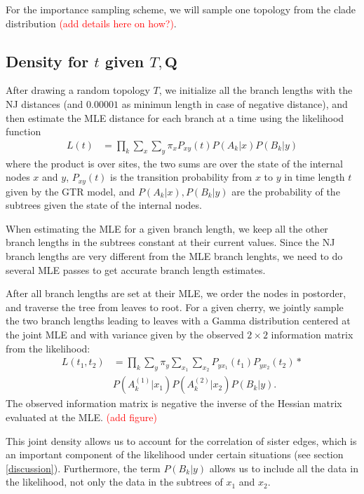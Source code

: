 \documentclass[conference]{IEEEtran}
\newcommand{\falta}[1]{\textcolor{red}{#1}}
\begin{document}
For the importance sampling scheme, we will sample one topology from
the clade distribution \falta{(add details here on how?)}.


\subsection*{Density for $t$ given $T,\mathbf{Q}$}
After drawing a random topology $T$, we initialize all the branch
lengths with the NJ distances (and $0.00001$ as minimun length in case
of negative distance), and then estimate the MLE distance for each
branch at a time using the likelihood function
\begin{align*}
L(t) &= \prod_k \sum_x \sum_y \pi_x P_{xy}(t)P(A_k|x)P(B_k|y)
\end{align*}
where the product is over sites, the two sums are over the state of the
internal nodes $x$ and $y$, $P_{xy}(t)$ is the transition probability
from $x$ to $y$ in time length $t$ given by the GTR model, and
$P(A_k|x), P(B_k|y)$ are the probability of the subtrees given the
state of the internal nodes.

When estimating the MLE for a given branch length, we keep all the
other branch lengths in the subtrees constant at their current
values. Since the NJ branch lengths are very different from the MLE
branch lenghts, we need to do several MLE passes to get accurate
branch length estimates.

After all branch lengths are set at their MLE, we order the nodes in
postorder, and traverse the tree from leaves to root. For a given
cherry, we jointly sample the two branch lengths leading to leaves
with a Gamma distribution centered at the joint MLE and with variance
given by the observed $2 \times 2$ information matrix from the
likelihood:
\begin{align*}
L(t_1,t_2) &= \prod_k \sum_y \pi_y \sum_{x_1} \sum_{x_2}
P_{yx_1}(t_1)P_{yx_2}(t_2) * \\
&P(A^{(1)}_k|x_1)P(A^{(2)}_k|x_2)P(B_k|y).
\end{align*}
The observed information matrix is negative the inverse of the Hessian
matrix evaluated at the MLE.
\falta{(add figure)}

This joint density allows us to account for the correlation of
sister edges, which is an important component of the likelihood under
certain situations (see section \ref{discussion}). Furthermore, the
term $P(B_k|y)$ allows us to include all the data in the likelihood,
not only the data in the subtrees of $x_1$ and $x_2$.
\end{document}
